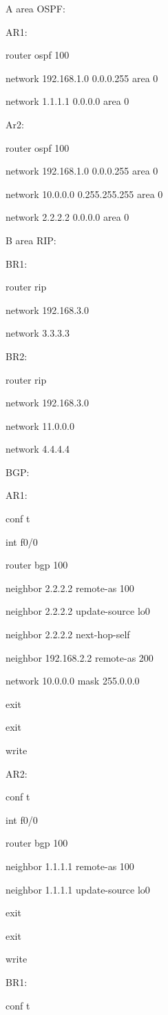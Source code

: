 \documentclass[12pt]{article}
\begin{document}
\noindent A area OSPF:

\noindent AR1:

router ospf 100

network 192.168.1.0 0.0.0.255 area 0

network 1.1.1.1 0.0.0.0 area 0

\noindent Ar2:

router ospf 100

network 192.168.1.0 0.0.0.255 area 0

network 10.0.0.0 0.255.255.255 area 0

network 2.2.2.2 0.0.0.0 area 0

\noindent B area RIP:

\noindent BR1:

router rip

network 192.168.3.0

network 3.3.3.3

\noindent BR2:

router rip

network 192.168.3.0

network 11.0.0.0

network 4.4.4.4


\noindent BGP:

\noindent AR1:

conf t

int f0/0

router bgp 100

neighbor 2.2.2.2 remote-as 100

neighbor 2.2.2.2 update-source lo0

neighbor 2.2.2.2 next-hop-self

neighbor 192.168.2.2 remote-as 200

network 10.0.0.0 mask 255.0.0.0

exit

exit

write

\noindent AR2:

conf t

int f0/0

router bgp 100

neighbor 1.1.1.1 remote-as 100

neighbor 1.1.1.1 update-source lo0

exit

exit

write

\noindent BR1:

conf t
\end{document}
